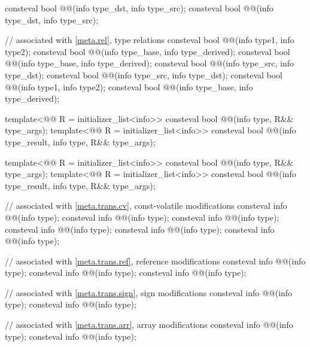 \begin{codeblock}
consteval bool @@(info type_dst, info type_src);
consteval bool @@(info type_dst, info type_src);

// associated with \ref{meta.rel}, type relations
consteval bool @@(info type1, info type2);
consteval bool @@(info type_base, info type_derived);
consteval bool @@(info type_base, info type_derived);
consteval bool @@(info type_src, info type_dst);
consteval bool @@(info type_src, info type_dst);
consteval bool @@(info type1, info type2);
consteval bool @@(info type_base, info type_derived);

template<@@ R = initializer_list<info>>
  consteval bool @@(info type, R&& type_args);
template<@@ R = initializer_list<info>>
  consteval bool @@(info type_result, info type, R&& type_args);

template<@@ R = initializer_list<info>>
  consteval bool @@(info type, R&& type_args);
template<@@ R = initializer_list<info>>
  consteval bool @@(info type_result, info type, R&& type_args);

// associated with \ref{meta.trans.cv}, const-volatile modifications
consteval info @@(info type);
consteval info @@(info type);
consteval info @@(info type);
consteval info @@(info type);
consteval info @@(info type);
consteval info @@(info type);

// associated with \ref{meta.trans.ref}, reference modifications
consteval info @@(info type);
consteval info @@(info type);
consteval info @@(info type);

// associated with \ref{meta.trans.sign}, sign modifications
consteval info @@(info type);
consteval info @@(info type);

// associated with \ref{meta.trans.arr}, array modifications
consteval info @@(info type);
consteval info @@(info type);


\end{codeblock}

